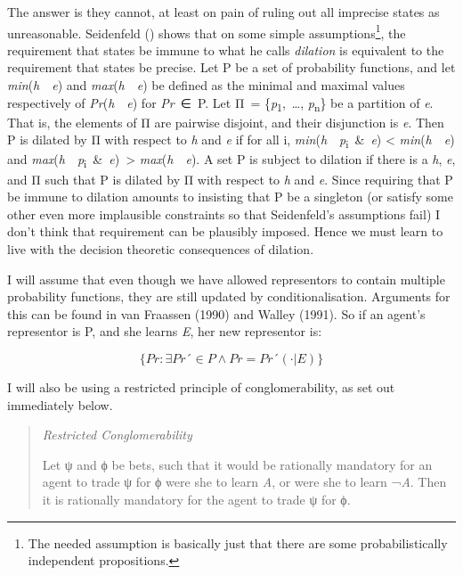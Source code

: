 \documentclass[
  11pt,
  letterpaper,
  DIV=11,
  numbers=noendperiod,
  twoside]{scrartcl}
\begin{document}
The answer is they cannot, at least on pain of ruling out all imprecise
states as unreasonable. Seidenfeld ()
shows that on some simple assumptions\footnote{The needed assumption is
  basically just that there are some probabilistically independent
  propositions.}, the requirement that states be immune to what he calls
\emph{dilation} is equivalent to the requirement that states be precise.
Let P be a set of probability functions, and let
\emph{min}(\emph{h}~\textbar~\emph{e}) and
\emph{max}(\emph{h}~\textbar~\emph{e}) be defined as the minimal and
maximal values respectively of \emph{Pr}(\emph{h}~\textbar~\emph{e}) for
\emph{Pr}~∈~P. Let Π~= \{\emph{p}\textsubscript{1},~\ldots,
\emph{p}\textsubscript{n}\} be a partition of \emph{e}. That is, the
elements of Π are pairwise disjoint, and their disjunction is \emph{e}.
Then P is dilated by Π with respect to \emph{h} and \emph{e} if for all
i, \emph{min}(\emph{h}~\textbar~\emph{p}\textsubscript{i}~\&~\emph{e})
\textless{} \emph{min}(\emph{h}~\textbar~\emph{e}) and
\emph{max}(\emph{h}~\textbar~\emph{p}\textsubscript{i}~\&~\emph{e})~\textgreater{}
\emph{max}(\emph{h}~\textbar~\emph{e}). A set P is subject to dilation
if there is a \emph{h}, \emph{e}, and Π such that P is dilated by Π with
respect to \emph{h} and \emph{e}. Since requiring that P be immune to
dilation amounts to insisting that P be a singleton (or satisfy some
other even more implausible constraints so that Seidenfeld's assumptions
fail) I don't think that requirement can be plausibly imposed. Hence we
must learn to live with the decision theoretic consequences of dilation.

I will assume that even though we have allowed representors to contain
multiple probability functions, they are still updated by
conditionalisation. Arguments for this can be found in van Fraassen
(1990) and Walley (1991). So if an agent's representor is P, and she
learns \emph{E}, her new representor is:

\[
\{Pr: \exists Pr´ \in P \wedge Pr = Pr´( \cdot | E)\}
\]

I will also be using a restricted principle of conglomerability, as set
out immediately below.

\begin{quote}
\emph{Restricted Conglomerability}

Let ψ and ϕ be bets, such that it would be rationally mandatory for an
agent to trade ψ for ϕ were she to learn \emph{A}, or were she to learn
¬\emph{A}. Then it is rationally mandatory for the agent to trade ψ for
ϕ.
\end{quote}
\end{document}
